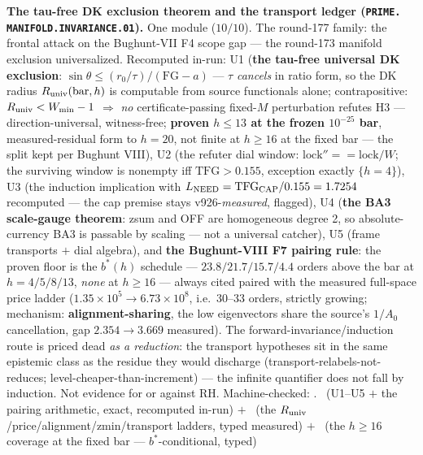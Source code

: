 \par\smallskip\noindent\textbf{The tau-free DK exclusion theorem
and the transport ledger (\texttt{PRIME.\allowbreak
MANIFOLD.\allowbreak INVARIANCE.01}).}
One module ($10/10$).  The round-177 family: the frontal attack on
the Bughunt-VII F4 scope gap --- the round-173 manifold exclusion
universalized.  Recomputed in-run: U1 (\textbf{the tau-free
universal DK exclusion}: $\sin\theta \le (r_0/\tau)/(\mathrm{FG} -
a)$ --- $\tau$ \emph{cancels} in ratio form, so the DK radius
$R_{\rm univ}(\mathrm{bar}, h)$ is computable from source
functionals alone; contrapositive: $R_{\rm univ} < W_{\min} - 1$
$\Rightarrow$ \emph{no} certificate-passing fixed-$M$ perturbation
refutes H3 --- direction-universal, witness-free; \textbf{proven
$h \le 13$ at the frozen $10^{-25}$ bar}, measured-residual form
to $h = 20$, not finite at $h \ge 16$ at the fixed bar --- the
split kept per Bughunt VIII), U2 (the refuter dial window:
$\mathrm{lock}'' == \mathrm{lock}/W$; the surviving window is
nonempty iff $\mathrm{TFG} > 0.155$, exception exactly $\{h =
4\}$), U3 (the induction implication with $L_{\rm NEED} =
\mathrm{TFG}_{\rm CAP}/0.155 = 1.7254$ recomputed --- the cap
premise stays v926-\emph{measured}, flagged), U4 (\textbf{the BA3
scale-gauge theorem}: zsum and OFF are homogeneous degree 2, so
absolute-currency BA3 is passable by scaling --- not a universal
catcher), U5 (frame transports $+$ dial algebra), and \textbf{the
Bughunt-VIII F7 pairing rule}: the proven floor is the $b^*(h)$
schedule --- $23.8/21.7/15.7/4.4$ orders above the bar at $h =
4/5/8/13$, \emph{none} at $h \ge 16$ --- always cited paired with
the measured full-space price ladder ($1.35\times10^{5} \to
6.73\times10^{8}$, i.e.\ 30--33 orders, strictly growing;
mechanism: \textbf{alignment-sharing}, the low eigenvectors share
the source's $1/A_0$ cancellation, gap $2.354 \to 3.669$
measured).  The forward-invariance/induction route is priced dead
\emph{as a reduction}: the transport hypotheses sit in the same
epistemic class as the residue they would discharge
(transport-relabels-not-reduces; level-cheaper-than-increment) ---
the infinite quantifier does not fall by induction.  Not evidence
for or against RH.
Machine-checked: .
\mE\ (U1--U5 $+$ the pairing arithmetic, exact, recomputed in-run)
$+$ \mC\ (the $R_{\rm univ}$/price/alignment/zmin/transport
ladders, typed measured) $+$ \mO\ (the $h \ge 16$ coverage at the
fixed bar --- $b^*$-conditional, typed)
\par\smallskip


